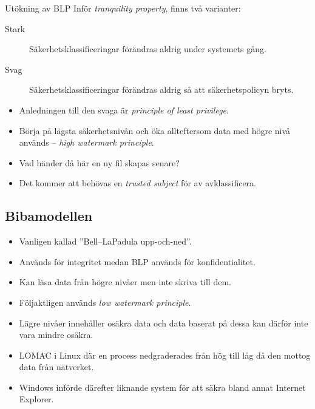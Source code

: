 \documentclass{beamer}
\begin{document}
\begin{frame}{\insertsubsectionhead}
  \begin{block}{Utökning av BLP}
    Inför \emph{tranquility property}, finns två varianter:
    \begin{description}
      \item[Stark] Säkerhetsklassificeringar förändras aldrig under systemets 
        gång.
      \item[Svag] Säkerhetsklassificeringar förändras aldrig så att 
        säkerhetspolicyn bryts.
    \end{description}
  \end{block}
  \begin{itemize}
    \item Anledningen till den svaga är \emph{principle of least privilege}.
    \item Börja på lägsta säkerhetsnivån och öka allteftersom data med högre 
      nivå används -- \emph{high watermark principle}.
    \item Vad händer då här en ny fil skapas senare?
    \item Det kommer att behövas en \emph{trusted subject} för av 
      avklassificera.
  \end{itemize}
\end{frame}

\subsection{Bibamodellen}
\begin{frame}{\insertsubsectionhead}
  \begin{itemize}
    \item Vanligen kallad ''Bell--LaPadula upp-och-ned''.
    \item Används för integritet medan BLP används för konfidentialitet.
    \item Kan läsa data från högre nivåer men inte skriva till dem.
    \item Följaktligen används \emph{low watermark principle}.
    \item Lägre nivåer innehåller osäkra data och data baserat på dessa kan 
      därför inte vara mindre osäkra.
    \item LOMAC i Linux där en process nedgraderades från hög till låg då den 
      mottog data från nätverket.
    \item Windows införde därefter liknande system för att säkra bland annat 
      Internet Explorer.
  \end{itemize}
\end{frame}
\end{document}

